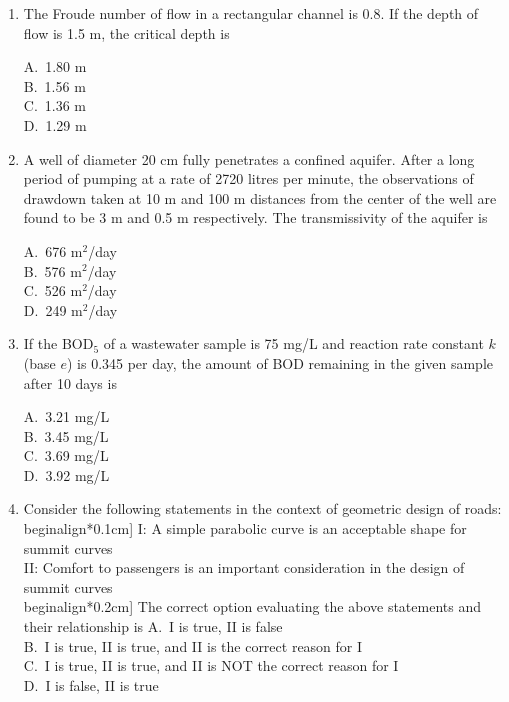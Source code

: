\documentclass[journal,12pt,onecolumn]{IEEEtran}
\theoremstyle{remark}
\begin{document}
\begin{enumerate}
\noindent\item The Froude number of flow in a rectangular channel is 0.8. If the depth of flow is 1.5 m, the critical depth is
\hfill{}
\begin{multicols}{4}
A.\ 1.80 m \\
B.\ 1.56 m \\
C.\ 1.36 m \\
D.\ 1.29 m
\end{multicols}

\noindent\item A well of diameter 20 cm fully penetrates a confined aquifer. After a long period of pumping at a rate of 2720 litres per minute, the observations of drawdown taken at 10 m and 100 m distances from the center of the well are found to be 3 m and 0.5 m respectively. The transmissivity of the aquifer is
\hfill{}
\begin{multicols}{4}
A.\ 676 m$^2$/day \\
B.\ 576 m$^2$/day \\
C.\ 526 m$^2$/day \\
D.\ 249 m$^2$/day
\end{multicols}

\noindent\item If the BOD$_5$ of a wastewater sample is 75 mg/L and reaction rate constant $k$ (base $e$) is 0.345 per day, the amount of BOD remaining in the given sample after 10 days is
\hfill{}
\begin{multicols}{4}
A.\ 3.21 mg/L \\
B.\ 3.45 mg/L \\
C.\ 3.69 mg/L \\
D.\ 3.92 mg/L
\end{multicols}

\noindent\item Consider the following statements in the context of geometric design of roads: \\begin{align*}0.1cm]
I: A simple parabolic curve is an acceptable shape for summit curves \\ 
II: Comfort to passengers is an important consideration in the design of summit curves \\begin{align*}0.2cm]
The correct option evaluating the above statements and their relationship is
\hfill{}\newline
A.\ I is true, II is false \\
B.\ I is true, II is true, and II is the correct reason for I \\
C.\ I is true, II is true, and II is NOT the correct reason for I \\
D.\ I is false, II is true


\end{enumerate}
\end{document}
